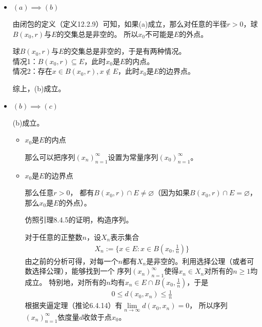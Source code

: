 \documentclass{article}
\begin{document}
\begin{itemize}
      \item $(a) \implies (b)$

            由闭包的定义（定义12.2.9）可知，如果(a)成立，那么对任意的半径$r > 0$，球$B(x_0, r)$与$E$的交集总是非空的。
            所以$x_0$不可能是$E$的外点。

            球$B(x_0, r)$与$E$的交集总是非空的，于是有两种情况。    \\
            情况1：$B(x_0, r) \subseteq E$，此时$x_0$是$E$的内点。 \\
            情况2：存在$x \in B(x_0, r), x \notin E$，此时$x_0$是$E$的边界点。

            综上，(b)成立。


      \item $(b) \implies (c)$

            (b)成立。

            \begin{itemize}
                  \item $x_0$是$E$的内点

                        那么可以把序列$(x_n)_{n=1}^\infty$设置为常量序列$(x_0)_{n=1}^\infty$。

                  \item $x_0$是$E$的边界点

                        那么任意$r > 0$，
                        都有$B(x_0, r) \cap E \neq \varnothing$（因为如果$B(x_0, r) \cap E = \varnothing$，那么$x_0$是$E$的外点）。

                        仿照引理8.4.5的证明，构造序列。

                        对于任意的正整数$n$，设$X_n$表示集合
                        \begin{align*}
                              X_n := \{x \in E: x \in B(x_0, \frac{1}{n})\}
                        \end{align*}
                        由之前的分析可得，对每一个$n$都有$X_n$是非空的。利用选择公理（或者可数选择公理），能够找到一个
                        序列$(x_n)_{n = 1}^\infty$使得$x_n \in X_n$对所有的$n \geq 1$均成立。
                        特别地，对所有的$n$均有$x_n \in E \cap B(x_0, \frac{1}{n})$，于是
                        \begin{align*}
                              0 \leq d(x_0, x_n) \leq \frac{1}{n}
                        \end{align*}
                        根据夹逼定理（推论6.4.14）有$\lim\limits_{n \to \infty} d(x_0, x_n) = 0$，
                        所以序列$(x_n)_{n = 1}^\infty$依度量$d$收敛于点$x_0$。
            \end{itemize}


\end{itemize}
\end{document}
